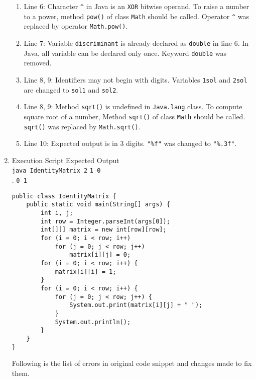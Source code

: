 \documentclass[12pt,letterpaper,twoside]{article}
\begin{document}
\begin{enumerate}[label=\textbf{(\alph*)}]
\begin{enumerate}[label=\arabic*.]
\item Line 6: Character \texttt{\^} in Java is an \texttt{XOR} bitwise operand. To raise a number to a power, method \texttt{pow()} of class \texttt{Math} should be called. Operator \texttt{\^} was replaced by operator \texttt{Math.pow()}.
\item Line 7: Variable \texttt{discriminant} is already declared as \texttt{double} in line 6. In Java, all variable can be declared only once. Keyword \texttt{double} was removed.
\item Line 8, 9: Identifiers may not begin with digits. Variables \texttt{1sol} and \texttt{2sol} are changed to \texttt{sol1} and \texttt{sol2}.
\item Line 8, 9: Method \texttt{sqrt()} is undefined in \texttt{Java.lang} class. To compute square root of a number, Method \texttt{sqrt()} of class \texttt{Math} should be called. \texttt{sqrt()} was replaced by \texttt{Math.sqrt()}.
\item Line 10: Expected output is in 3 digits. \texttt{"\%f"} was changed to \texttt{"\%.3f"}.
\end{enumerate}

\item Execution Script \hfill Expected Output\\
\texttt{java IdentityMatrix 2} \hfill \texttt{1 0}\\ . \hfill \texttt{0 1}

\begin{lstlisting}
public class IdentityMatrix {
	public static void main(String[] args) {
		int i, j;
		int row = Integer.parseInt(args[0]);
		int[][] matrix = new int[row][row];
		for (i = 0; i < row; i++)
			for (j = 0; j < row; j++)
				matrix[i][j] = 0;
		for (i = 0; i < row; i++) {
			matrix[i][i] = 1;
		}
		for (i = 0; i < row; i++) {
			for (j = 0; j < row; j++) {
				System.out.print(matrix[i][j] + " ");
			}
			System.out.println();
		}
	}
}
\end{lstlisting}

Following is the list of errors in original code snippet and changes made to fix them.


\end{enumerate}
\end{document}
